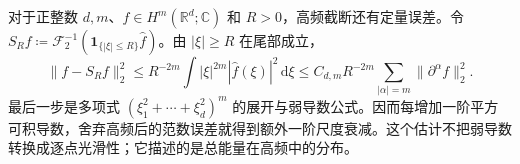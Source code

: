 \ProseParagraphBreak

对于正整数 \(d,m\)、\(f\in H^m(\mathbb R^d;\mathbb C)\) 和 \(R>0\)，高频截断还有定量误差。令 \(S_Rf\coloneqq\mathcal F_2^{-1}(\mathbf1_{\{|\xi|\leq R\}}\widehat f)\)。由 \(|\xi|\geq R\) 在尾部成立，
\[
 \|f-S_Rf\|_2^2
 \leq R^{-2m}\int|\xi|^{2m}|\widehat f(\xi)|^2\,\mathrm{d}\xi
 \leq C_{d,m}R^{-2m}\sum_{|\alpha|=m}\|\partial^\alpha f\|_2^2.
\]
最后一步是多项式 \((\xi_1^2+\cdots+\xi_d^2)^m\) 的展开与弱导数公式。因而每增加一阶平方可积导数，舍弃高频后的范数误差就得到额外一阶尺度衰减。这个估计不把弱导数转换成逐点光滑性；它描述的是总能量在高频中的分布。
